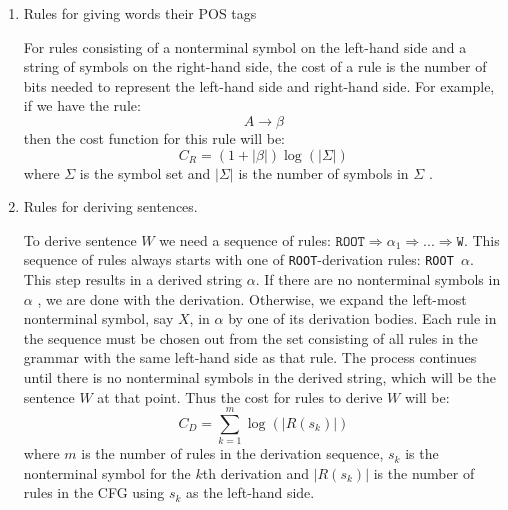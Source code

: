 \documentclass[paper=a4, fontsize=11pt]{scrartcl} %
\numberwithin{equation}{section} %
\numberwithin{figure}{section} %
\numberwithin{table}{section} %
\begin{document}
\begin{enumerate}[1.]
\item Rules for giving words their POS tags

For rules consisting of a nonterminal symbol on the left-hand side and a string of symbols on the right-hand side, the cost of a rule is the number of bits needed to represent the left-hand side and right-hand side. For example, if we have the rule:
\begin{equation}\label{first}
A  \rightarrow \beta
\end{equation}
then the cost function for this rule will be:
\begin{equation}\label{first}
C_R = (1+\lvert\beta\rvert) \log(\lvert\Sigma\rvert)
\end{equation}
where \begin{math} \Sigma \end{math}  is the symbol set and \begin{math} \lvert\Sigma\rvert \end{math} is the number of symbols in \begin{math} \Sigma \end{math} .
\item Rules for deriving sentences.

To derive sentence $W$ we need a sequence of rules: \begin{math} \texttt{ROOT} \Rightarrow \alpha_1 \Rightarrow ... \Rightarrow \texttt{W} \end{math}. This sequence of rules always starts with one of \texttt{ROOT}-derivation rules: \texttt{ROOT \textrightarrow $\alpha$}. This step results in a derived string \begin{math} \alpha \end{math}. If there are no nonterminal symbols in \begin{math} \alpha \end{math} , we are done with the derivation. Otherwise, we expand the left-most nonterminal symbol, say $X$, in \begin{math} \alpha \end{math} by one of its derivation bodies. Each rule in the sequence must be chosen out from the set consisting of all rules in the grammar with the same left-hand side as that rule. The process continues until there is no nonterminal symbols in the derived string, which will be the sentence $W$ at that point. Thus the cost for rules to derive $W$ will be:
\begin{equation}\label{first}
C_D = \sum \limits_{k=1}^m \log(\lvert R(s_k)\rvert)
\end{equation}
where $m$ is the number of rules in the derivation sequence, \begin{math} s_k \end{math} is the nonterminal symbol for the $k$th derivation and \begin{math} \lvert R(s_k)\rvert \end{math} is the number of rules in the CFG using \begin{math} s_k \end{math} as the left-hand side.
\end{enumerate}
\end{document}
